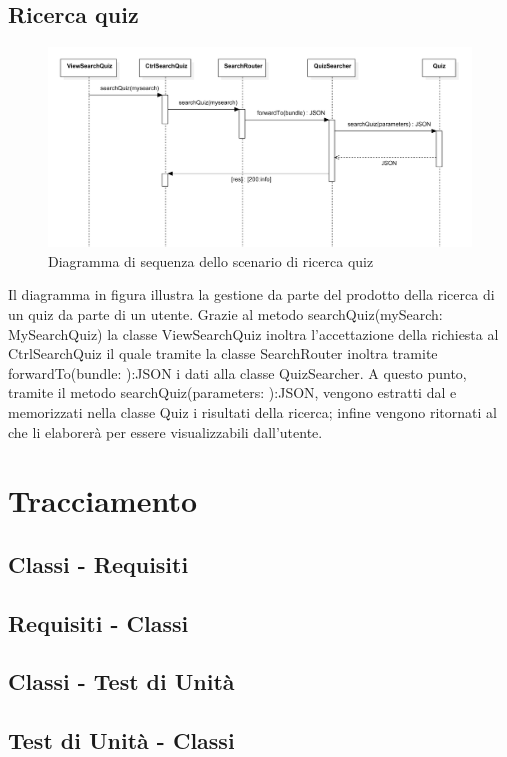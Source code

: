 \documentclass[a4paper, titlepage]{article}
\begin{document}
\newpage
\subsection{Ricerca quiz}
\begin{figure}[!h]
	\centering
	\includegraphics[scale=0.5]{Img/seq-searchquiz.pdf}
	\caption{Diagramma di sequenza dello scenario di ricerca quiz}
\end{figure}
Il diagramma in figura illustra la gestione da parte del prodotto della ricerca di un quiz da parte di un utente. Grazie al metodo searchQuiz(mySearch: MySearchQuiz) la classe ViewSearchQuiz inoltra l'accettazione della richiesta al CtrlSearchQuiz il quale tramite la classe SearchRouter inoltra tramite forwardTo(bundle: ):JSON i dati alla classe QuizSearcher. A questo punto, tramite il metodo searchQuiz(parameters: ):JSON, vengono estratti dal  e memorizzati nella classe Quiz i risultati della ricerca; infine vengono ritornati al  che li elaborerà per essere visualizzabili dall'utente.

\newpage
\appendix
\section{Tracciamento}

\subsection{Classi - Requisiti}


\subsection{Requisiti - Classi}


\subsection{Classi - Test di Unità}


\subsection{Test di Unità - Classi}

\end{document}
